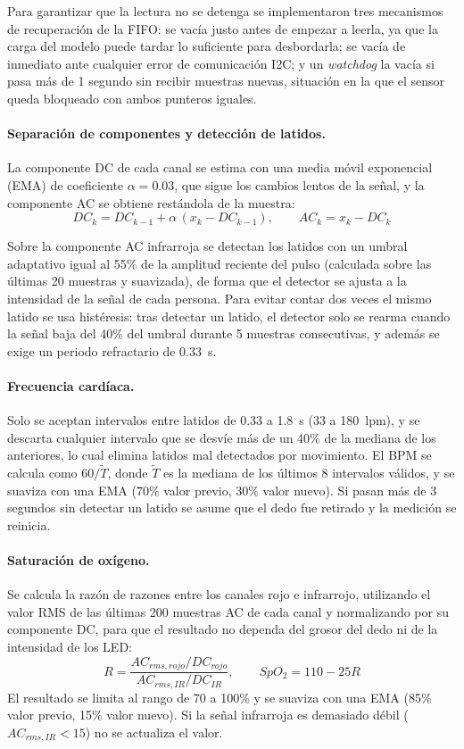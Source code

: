 \documentclass[11pt,a4paper]{article}
\begin{document}
Para garantizar que la lectura no se detenga se implementaron tres mecanismos de recuperación de la FIFO: se vacía justo antes de empezar a leerla, ya que la carga del modelo puede tardar lo suficiente para desbordarla; se vacía de inmediato ante cualquier error de comunicación I2C; y un \textit{watchdog} la vacía si pasa más de 1 segundo sin recibir muestras nuevas, situación en la que el sensor queda bloqueado con ambos punteros iguales.

\paragraph{Separación de componentes y detección de latidos.} La componente DC de cada canal se estima con una media móvil exponencial (EMA) de coeficiente $\alpha = 0.03$, que sigue los cambios lentos de la señal, y la componente AC se obtiene restándola de la muestra:
\begin{equation}
    DC_k = DC_{k-1} + \alpha\,(x_k - DC_{k-1}), \qquad AC_k = x_k - DC_k
\end{equation}

Sobre la componente AC infrarroja se detectan los latidos con un umbral adaptativo igual al 55\% de la amplitud reciente del pulso (calculada sobre las últimas 20 muestras y suavizada), de forma que el detector se ajusta a la intensidad de la señal de cada persona. Para evitar contar dos veces el mismo latido se usa histéresis: tras detectar un latido, el detector solo se rearma cuando la señal baja del 40\% del umbral durante 5 muestras consecutivas, y además se exige un periodo refractario de 0.33~s.

\paragraph{Frecuencia cardíaca.} Solo se aceptan intervalos entre latidos de 0.33 a 1.8~s (33 a 180~lpm), y se descarta cualquier intervalo que se desvíe más de un 40\% de la mediana de los anteriores, lo cual elimina latidos mal detectados por movimiento. El BPM se calcula como $60/\tilde{T}$, donde $\tilde{T}$ es la mediana de los últimos 8 intervalos válidos, y se suaviza con una EMA (70\% valor previo, 30\% valor nuevo). Si pasan más de 3 segundos sin detectar un latido se asume que el dedo fue retirado y la medición se reinicia.

\paragraph{Saturación de oxígeno.} Se calcula la razón de razones entre los canales rojo e infrarrojo, utilizando el valor RMS de las últimas 200 muestras AC de cada canal y normalizando por su componente DC, para que el resultado no dependa del grosor del dedo ni de la intensidad de los LED:
\begin{equation}
    R = \frac{AC_{rms,rojo}/DC_{rojo}}{AC_{rms,IR}/DC_{IR}}, \qquad SpO_2 = 110 - 25R
\end{equation}
El resultado se limita al rango de 70 a 100\% y se suaviza con una EMA (85\% valor previo, 15\% valor nuevo). Si la señal infrarroja es demasiado débil ($AC_{rms,IR} < 15$) no se actualiza el valor.
\end{document}
